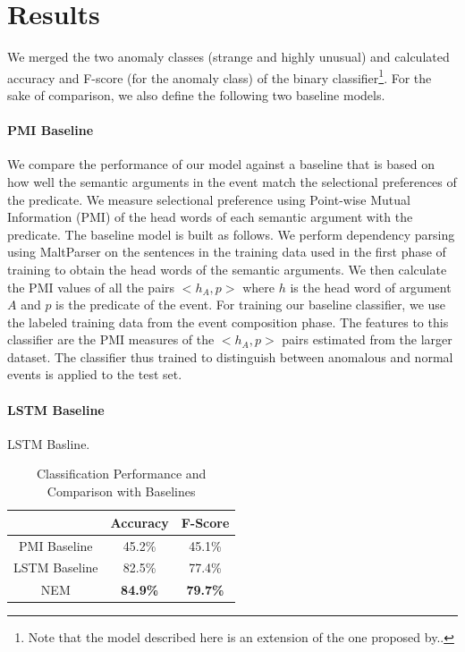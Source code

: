 \section{Results}
We merged the two anomaly classes (strange and highly unusual) and calculated accuracy and F-score (for the anomaly class) of the binary
classifier\footnote{Note that the model described here is an extension of the one proposed by..}. For the sake of comparison, we also define the following two baseline models.

\paragraph{PMI Baseline} We compare the performance of our model against a baseline that is based
on how well the semantic arguments in the event match the selectional preferences 
of the predicate.  We measure selectional preference using Point-wise Mutual Information
(PMI) \cite{church1990word} of the head words of each semantic argument with the predicate.  
The baseline model is built as follows.  We perform dependency parsing using MaltParser
\cite{nivre2007maltparser} on the sentences in the training data used in the first phase of training to
obtain the head words of the semantic arguments.  We then calculate the PMI values of all the pairs
$<h_A, p>$ where $h$ is the head word of argument $A$ and $p$ is the predicate of the event.  
For training our baseline classifier, we use the labeled training data from the event composition phase.
The features to this classifier are the PMI measures of the $<h_A, p>$ pairs estimated from the larger
dataset.  The classifier thus trained to distinguish between anomalous and normal events is applied to the test set.

\paragraph{LSTM Baseline} LSTM Basline.

\begin{table}
\begin{center}
  \begin{tabular}[c]{|c|c|c|}
 \cline{2-3}
 \multicolumn{1}{c|}{}& \textbf{Accuracy} & \textbf{F-Score} \\
 \hline
 PMI Baseline& 45.2\% & 45.1\%\\
 LSTM Baseline & 82.5\% & 77.4\%\\
 \hline
 NEM & \textbf{84.9\%}& \textbf{79.7\%}\\
 \hline
  \end{tabular}
\end{center}
 \caption{Classification Performance and Comparison with Baselines}
 \label{table:nem_anomaly_results}
\end{table}

